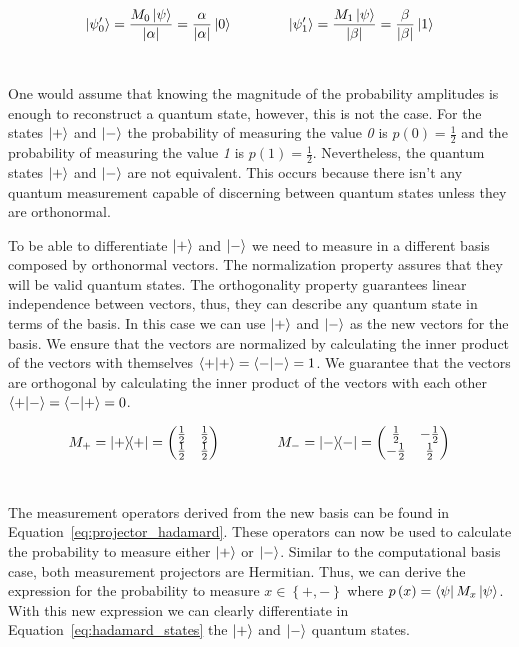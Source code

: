 \begin{equation}\label{eq:state_after_computational}
    \ket{\psi_0'} = \frac{M_0\ket{\psi}}{\abs{\alpha}} =
    \frac{\alpha}{\abs{\alpha}}\ket{0} \qquad \qquad
    \ket{\psi_1'} = \frac{M_1\ket{\psi}}{\abs{\beta}} =
    \frac{\beta}{\abs{\beta}}\ket{1}
\end{equation} \

One would assume that knowing the magnitude of the probability amplitudes
is enough to reconstruct a quantum state, however, this is not the case.
For the states \(\ket{+}\) and \(\ket{-}\) the probability of measuring
the value \textit{0} is \(p\left(0\right) = \frac{1}{2}\) and the probability
of measuring the value \textit{1} is \(p\left(1\right) = \frac{1}{2}\).
Nevertheless, the quantum states \(\ket{+}\) and \(\ket{-}\) are not
equivalent. This occurs because there isn't any quantum measurement capable
of discerning between quantum states unless they are orthonormal.\

To be able to differentiate \(\ket{+}\) and \(\ket{-}\) we
need to measure in a different basis composed by orthonormal vectors.
The normalization property assures that they will be valid quantum states.
The orthogonality property guarantees linear independence between vectors,
thus, they can describe any quantum state in terms of the basis. In
this case we can use \(\ket{+}\) and \(\ket{-}\) as the new vectors for
the basis. We ensure that the vectors are normalized by calculating the
inner product of the vectors with themselves \(\braket{+}{+}=\braket{-}{-}=1\).
We guarantee that the vectors are orthogonal by calculating the
inner product of the vectors with each other \(\braket{+}{-}=\braket{-}{+}=0\). \

\begin{equation}\label{eq:projector_hadamard}
  M_+ = \ketbra{+}{+} = \begin{pmatrix}
                          \frac{1}{2} & \frac{1}{2} \\
                          \frac{1}{2} & \frac{1}{2}
                        \end{pmatrix} \qquad \qquad
  M_- = \ketbra{-}{-} = \begin{pmatrix}
                          \frac{1}{2} & -\frac{1}{2} \\
                          -\frac{1}{2} & \frac{1}{2}
                        \end{pmatrix}
\end{equation} \

The measurement operators derived from the new basis can be found
in Equation~\ref{eq:projector_hadamard}. These operators can now
be used to calculate the probability to measure either \(\ket{+}\)
or \(\ket{-}\). Similar to the computational basis case, both
measurement projectors are Hermitian. Thus, we can derive the
expression for the probability to measure \(x \in \left\{+,-\right\}\)
where \(p\left(x\right) = \bra{\psi}M_x\ket{\psi}\). With this new
expression we can clearly differentiate in Equation~\ref{eq:hadamard_states}
the \(\ket{+}\) and \(\ket{-}\) quantum states. \

